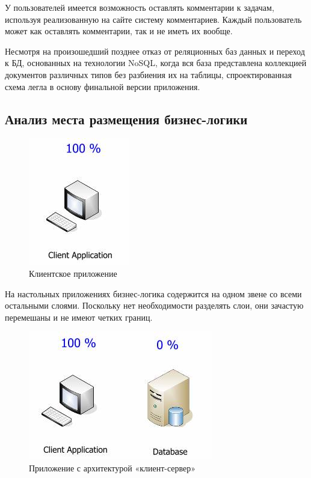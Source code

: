 \documentclass[a4paper, 14pt]{extarticle}
\begin{document}
У пользователей имеется возможность оставлять комментарии к задачам, используя реализованную на сайте систему комментариев. Каждый пользователь может как оставлять комментарии, так и не иметь их вообще.

Несмотря на произошедший позднее отказ от реляционных баз данных и переход к БД, основанных на технологии NoSQL, когда вся база представлена коллекцией документов различных типов без разбиения их на таблицы, спроектированная схема легла в основу финальной версии приложения.

\subsection{Анализ места размещения бизнес-логики}
\begin{figure}[!htb]
  \centering
    \includegraphics[scale=0.6]{../shared_images/business-logic/client.jpg}
   \caption{Клиентское приложение}
    \label{fig:start}
\end{figure}

На настольных приложениях бизнес-логика содержится на одном звене со всеми остальными слоями. Поскольку нет необходимости разделять слои, они зачастую перемешаны и не имеют четких границ.

\begin{figure}[!htb]
  \centering
    \includegraphics[scale=0.6]{../shared_images/business-logic/client-server.jpg}
   \caption{Приложение с архитектурой «клиент-сервер»}
    \label{fig:start}
\end{figure}
\end{document}
